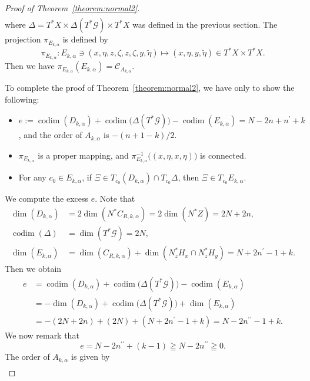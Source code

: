 \documentclass[a4paper,11pt,reqno]{amsart}
\theoremstyle{definition}
\theoremstyle{remark}
\begin{document}
\begin{proof}[Proof of Theorem~\ref{theorem:normal2}]
\begin{align}
\end{align}
%
%
where $\Delta=T^\ast{X}\times\Delta(T^\ast\mathcal{G}){\times}T^\ast{X}$ 
was defined in the previous section.  
The projection $\pi_{E_{k,\alpha}}$ is defined by 
%
%
$$
\pi_{E_{k,\alpha}}: 
E_{k,\alpha}\ni(x,\eta,z,\zeta,z,\zeta,y,\tilde{\eta}) 
\mapsto 
(x,\eta,y,\tilde{\eta})
\in 
T^\ast{X}{\times}T^\ast{X}. 
$$
%
%
Then we have $\pi_{E_{k,\alpha}}(E_{k,\alpha})=\mathcal{C}_{A_{k,\alpha}}$. 
%
%
\par
%
%
To complete the proof of Theorem~\ref{theorem:normal2}, we have only to show the following:  
%
%
\begin{itemize}
\item 
$e:=\operatorname{codim}(D_{k,\alpha})+\operatorname{codim}\bigl(\Delta(T^\ast\mathcal{G})\bigr)-\operatorname{codim}(E_{k,\alpha})=N-2n+n^\prime+k$, and the order of $A_{k,\alpha}$ is $-(n+1-k)/2$. 
\item 
$\pi_{E_{k,\alpha}}$ is a proper mapping, and 
$\pi_{E_{k,\alpha}}^{-1}\bigl((x,\eta,x,\eta)\bigr)$ is connected. 
\item 
For any $c_0 \in E_{k,\alpha}$, 
if $\Xi \in T_{c_0}(D_{k,\alpha}){\cap}T_{c_0}\Delta$, 
then $\Xi \in T_{c_0}E_{k,\alpha}$.  
\end{itemize}
%
%
\par
%
%
We compute the excess $e$. Note that 
%
%
\begin{align*}
  \dim(D_{k,\alpha})
& =
  2\dim(N^\ast{C_{R,k,\alpha}})
  =
  2\dim(N^\ast{Z})
  =
  2N+2n,
\\
  \operatorname{codim}(\Delta)
& =
  \dim(T^\ast\mathcal{G})
  =
  2N,
\\
  \dim(E_{k,\alpha})
& =
  \dim(C_{R,k,\alpha})
  +
  \dim(N^\ast_zH_x{\cap}N^\ast_zH_y)
  =
  N+2n^\prime-1+k. 
\end{align*}
%
%
Then we obtain 
%
%
\begin{align*}
  e
& =
  \operatorname{codim}(D_{k,\alpha})
  +
  \operatorname{codim}\bigl(\Delta(T^\ast\mathcal{G})\bigr)
  -
  \operatorname{codim}(E_{k,\alpha})
\\
& =
  -
  \operatorname{dim}(D_{k,\alpha})
  +
  \operatorname{codim}\bigl(\Delta(T^\ast\mathcal{G})\bigr)
  +
  \operatorname{dim}(E_{k,\alpha})
\\
& =
  -(2N+2n)+(2N)+(N+2n^\prime-1+k)
  =
  N-2n^{\prime\prime}-1+k.  
\end{align*}
%
%
We now remark that 
%
%
$$
e=N-2n^{\prime\prime}+(k-1) \geqq N-2n^{\prime\prime}\geqq0.
$$
%
% 
The order of $A_{k,\alpha}$ is given by 
%
%
\begin{align*}

\end{align*}
\end{proof}
\end{document}
